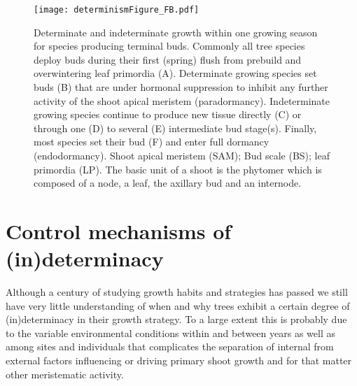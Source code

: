 \documentclass{article}
\begin{document}
								\begin{figure}
								\centering
								\texttt{[image: determinismFigure\_FB.pdf]} 
								\caption{Determinate and indeterminate growth within one growing season for species producing terminal buds. Commonly all tree species deploy buds during their first (spring) flush from prebuild and overwintering leaf primordia (A). Determinate growing species set buds (B) that are under hormonal suppression to inhibit any further activity of the shoot apical meristem (paradormancy). Indeterminate growing species continue to produce new tissue directly (C) or through one (D) to several (E) intermediate bud stage(s). Finally, most species set their bud (F) and enter full dormancy (endodormancy). Shoot apical meristem (SAM); Bud scale (BS); leaf primordia (LP). The basic unit of a shoot is the phytomer which is composed of a node, a leaf, the axillary bud and an internode.}
								\label{fig:fig_2xxx}
								\end{figure}
								
	\section*{Control mechanisms of (in)determinacy}
	Although a century of studying growth habits and strategies has passed we still have very little understanding of when and why trees exhibit a certain degree of (in)determinacy in their growth strategy. To a large extent this is probably due to the variable environmental conditions within and between years as well as among sites and individuals that complicates the separation of internal from external factors influencing or driving primary shoot growth and for that matter other meristematic activity.
	
\end{document}
